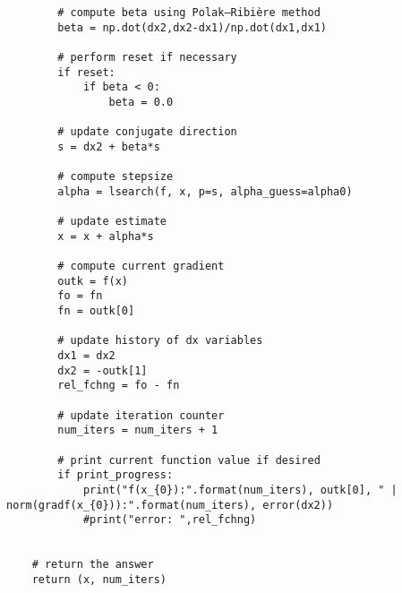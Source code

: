 {\begin{verbatim}
        # compute beta using Polak–Ribière method
        beta = np.dot(dx2,dx2-dx1)/np.dot(dx1,dx1)

        # perform reset if necessary
        if reset:
            if beta < 0:
                beta = 0.0

        # update conjugate direction
        s = dx2 + beta*s

        # compute stepsize
        alpha = lsearch(f, x, p=s, alpha_guess=alpha0)

        # update estimate
        x = x + alpha*s

        # compute current gradient
        outk = f(x)
        fo = fn
        fn = outk[0]

        # update history of dx variables
        dx1 = dx2
        dx2 = -outk[1]
        rel_fchng = fo - fn

        # update iteration counter
        num_iters = num_iters + 1

        # print current function value if desired
        if print_progress:
            print("f(x_{0}):".format(num_iters), outk[0], " | norm(gradf(x_{0})):".format(num_iters), error(dx2))
            #print("error: ",rel_fchng)


    # return the answer
    return (x, num_iters)
\end{verbatim}
}

